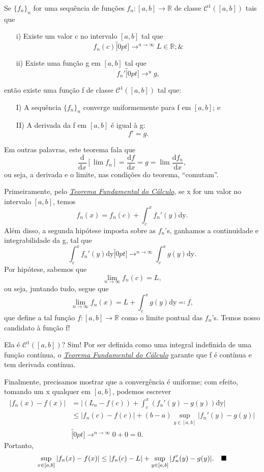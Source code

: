 \documentclass[../analysisII_notes.tex]{subfiles}
\begin{document}
\begin{theorem*}
	Se \(\{f_{n}\}_{n}\) for uma sequência de funções \(f_{n}:[a, b]\rightarrow \mathbb{R}\) de classe \(\mathcal{C}^{1}([a, b])\) tais que
	\begin{itemize}
		\item[i)] Existe um valor c no intervalo \([a, b]\) tal que
		      \[
			      f_{n}(c)\overbracket[0pt]{\longrightarrow}^{n\to \infty}L\in \mathbb{R};\&
		      \]
		\item[ii)] Existe uma função g em \([a, b]\) tal que
		      \[
			      f_{n}'\overbracket[0pt]{\longrightarrow}^{u}g,
		      \]
	\end{itemize}
	então existe uma função f de classe \(\mathcal{C}^{1}([a, b])\) tal que:
	\begin{itemize}
		\item[I)] A sequência \(\{f_{n}\}_{n}\) converge uniformemente para f em \([a, b]\); e
		\item[II)] A derivada da f em \([a, b]\) é igual à g:
		      \[
			      f'=g.
		      \]
	\end{itemize}
\end{theorem*}
Em outras palavras, este teorema fala que
\[
	\frac{\mathrm{d}}{\mathrm{d}x}[\lim_{}f_{n}] = \frac{\mathrm{d}f}{\mathrm{d}x} = g = \lim_{}\frac{\mathrm{d}f_{n}}{\mathrm{d}x},
\]
ou seja, a derivada e o limite, nas condições do teorema, ``comutam''.
\begin{proof*}
	Primeiramente, pelo \hyperlink{ftc}{\textit{Teorema Fundamental do Cálculo}}, se x for um valor no intervalo \([a, b]\), temos
	\[
		f_{n}(x) = f_{n}(c) + \int_{c}^{x}f_{n}'(y) \mathrm{dy}.
	\]
	Além disso, a segunda hipótese imposta sobre as \(f_{n}\)'s, ganhamos a continuidade e integrabilidade da g, tal que
	\[
		\int_{c}^{x}f_{n}'(y) \mathrm{dy}\overbracket[0pt]{\longrightarrow}^{n\to \infty}\int_{c}^{x}g(y) \mathrm{dy}.
	\]
	Por hipótese, sabemos que
	\[
		\lim_{n\to \infty}f_{n}(c) = L,
	\]
	ou seja, juntando tudo, segue que
	\[
		\lim_{n\to \infty}f_{n}(x) = L + \int_{c}^{x}g(y) \mathrm{dy} \eqqcolon f,
	\]
	que define a tal função \(f:[a, b]\rightarrow \mathbb{R}\) como o limite pontual das \(f_{n}\)'s. Temos nosso candidato à função f!

	Ela é \(\mathcal{C}^{1}([a, b])\)? Sim! Por ser definida como uma integral indefinida de uma função contínua, o \hyperlink{ftc}{\textit{Teorema Fundamental do Cálculo}} garante que f é contínua e tem derivada contínua.

	Finalmente, precisamos mostrar que a convergência é uniforme; com efeito, tomando um x qualquer em \([a, b]\), podemos escrever
	\begin{align*}
		|f_{n}(x)-f(x)| & = \biggl\vert (L_{n} - f(c)) + \int_{c}^{x}(f_{n}'(y)-g(y)) \mathrm{dy} \biggr\vert \\
		                & \leq |f_{n}(c)-f(c)| + (b-a)\sup_{y\in[a, b]}|f_{n}'(y) - g(y)|                     \\
		                & \overbracket[0pt]{\longrightarrow}^{n\to \infty}0 + 0 = 0.
	\end{align*}
	Portanto,
	\[
		\sup_{x\in [a, b]}|f_{n}(x)-f(x)|\leq |f_{n}(c)-L|+\sup_{y\in [a, b]}|f_{n}'(y)-g(y)|.\quad \text{$\blacksquare$}
	\]
\end{proof*}
\end{document}
